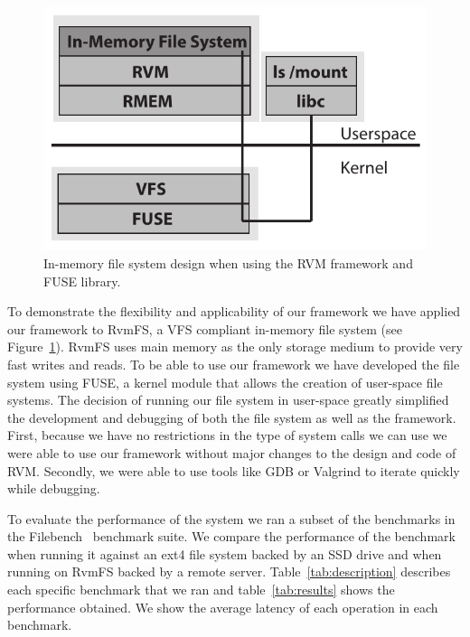 
\begin{figure}[t!]
\begin{center}
\includegraphics[scale=0.60]{graphs/inmem_fs_design.pdf}
\end{center}
\caption{In-memory file system design when using the RVM framework and FUSE library.}
\label{fig:inmem_fs_design}
\end{figure}

To demonstrate the flexibility and applicability of our framework we have applied our framework to RvmFS, a VFS compliant in-memory file system (see Figure~\ref{fig:inmem_fs_design}). 
RvmFS uses main memory as the only storage medium to provide very fast writes and reads. 
To be able to use our framework we have developed the file system using FUSE, a kernel module that allows the creation of user-space file systems.
The decision of running our file system in user-space greatly simplified the development and debugging of both the file system as well as the framework. 
First, because we have no restrictions in the type of system calls we can use we were able to use our framework without major changes to the design and code of RVM.
Secondly, we were able to use tools like GDB or Valgrind to iterate quickly while debugging.

To evaluate the performance of the system we ran a subset of the benchmarks in the Filebench~\cite{filebench} benchmark suite. 
We compare the performance of the benchmark when running it against an ext4 file system backed by an SSD drive and when running on RvmFS backed by a remote server.
Table~\ref{tab:description} describes each specific benchmark that we ran and table~\ref{tab:results} shows the performance obtained.
We show the average latency of each operation in each benchmark.

